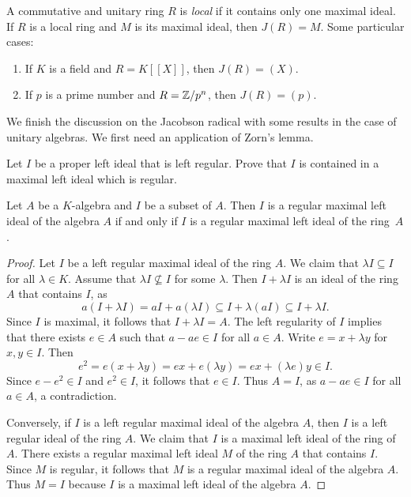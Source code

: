 \begin{example}
    A commutative and unitary ring $R$ is \emph{local} if it contains
    only one maximal ideal. 
	If $R$ is a local ring and $M$ is its maximal ideal, then $J(R)=M$. Some particular cases: 
	\begin{enumerate}
		\item If $K$ is a field and $R=K[\![X]\!]$, then $J(R)=(X)$. 
		\item If $p$ is a prime number and $R=\mathbb{Z}/p^n$, then $J(R)=(p)$. 
	\end{enumerate}
\end{example}

We finish the discussion on the Jacobson radical with 
some results in the case of unitary algebras. We first need an application of Zorn's lemma. 

\begin{exercise}
\label{xca:maximal_regular}
    Let $I$ be a proper left ideal that is left regular. Prove that $I$ is contained in a maximal left ideal 
    which is regular. 
\end{exercise}


\begin{proposition}
	Let $A$ be a $K$-algebra and $I$ be a subset of $A$. Then $I$ is 
	a regular maximal left ideal of the algebra $A$ if and only if $I$ is 
	a regular maximal left ideal of the ring~$A$.
\end{proposition}

\begin{proof}
	Let $I$ be a left regular maximal ideal of the ring $A$. We claim that
	$\lambda I\subseteq I$ for all $\lambda\in K$. Assume that 
	$\lambda I\not\subseteq I$ for some $\lambda$. Then $I+\lambda I$
	is an ideal of the ring $A$ that contains $I$, as 
	\[
	a(I+\lambda I)=aI+a(\lambda I)\subseteq I+\lambda (aI)\subseteq I+\lambda I.
	\]
	Since $I$ is maximal, it follows that $I+\lambda I=A$. 
	The left regularity of $I$ implies that there exists $e\in A$
	such that 
	$a-ae\in I$ for all $a\in A$. Write $e=x+\lambda y$ for $x,y\in
	I$. Then 
	\[
		e^2=e(x+\lambda y)=ex+e(\lambda y)=ex+(\lambda e)y\in I.
	\]
	Since $e-e^2\in I$ and $e^2\in I$, it follows that $e\in I$. Thus $A=I$, as
	$a-ae\in I$ for all $a\in A$, a contradiction.

	Conversely, if $I$ is a left regular maximal ideal of the algebra $A$, then 
	$I$ is a left regular ideal of the ring $A$. We claim that $I$ is a maximal left ideal of the ring of $A$. 
	There exists a regular maximal left ideal $M$ 
	of the ring $A$ that contains $I$. Since 
	$M$ is regular, it follows that $M$ is a regular maximal ideal of the algebra $A$. Thus 
	$M=I$ because $I$ is a maximal left ideal of the algebra $A$. 
\end{proof}

